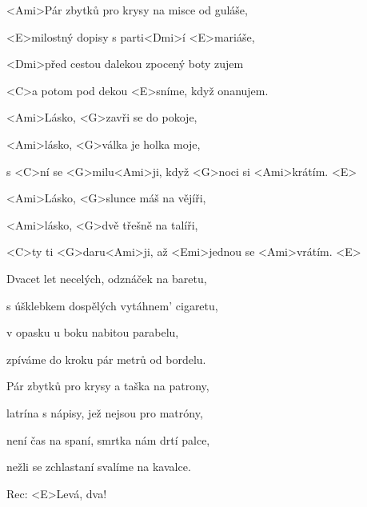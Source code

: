 

\zs
<Ami>Pár zbytků pro krysy na misce od guláše,

<E>milostný dopisy s parti<Dmi>í <E>mariáše,

<Dmi>před cestou dalekou zpocený boty zujem

<C>a potom pod dekou <E>sníme, když onanujem.
\ks

\zr
<Ami>Lásko, <G>zavři se do pokoje,

<Ami>lásko, <G>válka je holka moje,

s <C>ní se <G>milu<Ami>ji, když <G>noci si <Ami>krátím. <E>

<Ami>Lásko, <G>slunce máš na vějíři,

<Ami>lásko, <G>dvě třešně na talíři,

<C>ty ti <G>daru<Ami>ji, až <Emi>jednou se <Ami>vrátím. <E>
\kr

\zs
Dvacet let necelých, odznáček na baretu,

s úšklebkem dospělých vytáhnem' cigaretu,

v opasku u boku nabitou parabelu,

zpíváme do kroku pár metrů od bordelu.
\ks

\zr \kr

\zs
Pár zbytků pro krysy a taška na patrony,

latrína s nápisy, jež nejsou pro matróny,

není čas na spaní, smrtka nám drtí palce,

nežli se zchlastaní svalíme na kavalce.
\ks

\zr \kr

Rec: <E>Levá, dva!

\zr \kr

\kp
